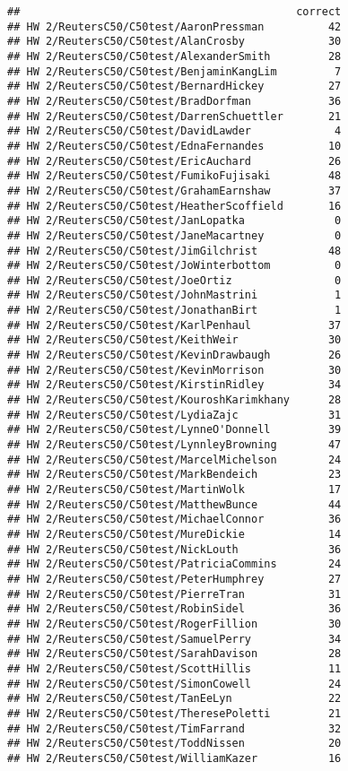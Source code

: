 \documentclass[]{article}
\begin{document}
\begin{verbatim}
##                                           correct
## HW 2/ReutersC50/C50test/AaronPressman          42
## HW 2/ReutersC50/C50test/AlanCrosby             30
## HW 2/ReutersC50/C50test/AlexanderSmith         28
## HW 2/ReutersC50/C50test/BenjaminKangLim         7
## HW 2/ReutersC50/C50test/BernardHickey          27
## HW 2/ReutersC50/C50test/BradDorfman            36
## HW 2/ReutersC50/C50test/DarrenSchuettler       21
## HW 2/ReutersC50/C50test/DavidLawder             4
## HW 2/ReutersC50/C50test/EdnaFernandes          10
## HW 2/ReutersC50/C50test/EricAuchard            26
## HW 2/ReutersC50/C50test/FumikoFujisaki         48
## HW 2/ReutersC50/C50test/GrahamEarnshaw         37
## HW 2/ReutersC50/C50test/HeatherScoffield       16
## HW 2/ReutersC50/C50test/JanLopatka              0
## HW 2/ReutersC50/C50test/JaneMacartney           0
## HW 2/ReutersC50/C50test/JimGilchrist           48
## HW 2/ReutersC50/C50test/JoWinterbottom          0
## HW 2/ReutersC50/C50test/JoeOrtiz                0
## HW 2/ReutersC50/C50test/JohnMastrini            1
## HW 2/ReutersC50/C50test/JonathanBirt            1
## HW 2/ReutersC50/C50test/KarlPenhaul            37
## HW 2/ReutersC50/C50test/KeithWeir              30
## HW 2/ReutersC50/C50test/KevinDrawbaugh         26
## HW 2/ReutersC50/C50test/KevinMorrison          30
## HW 2/ReutersC50/C50test/KirstinRidley          34
## HW 2/ReutersC50/C50test/KouroshKarimkhany      28
## HW 2/ReutersC50/C50test/LydiaZajc              31
## HW 2/ReutersC50/C50test/LynneO'Donnell         39
## HW 2/ReutersC50/C50test/LynnleyBrowning        47
## HW 2/ReutersC50/C50test/MarcelMichelson        24
## HW 2/ReutersC50/C50test/MarkBendeich           23
## HW 2/ReutersC50/C50test/MartinWolk             17
## HW 2/ReutersC50/C50test/MatthewBunce           44
## HW 2/ReutersC50/C50test/MichaelConnor          36
## HW 2/ReutersC50/C50test/MureDickie             14
## HW 2/ReutersC50/C50test/NickLouth              36
## HW 2/ReutersC50/C50test/PatriciaCommins        24
## HW 2/ReutersC50/C50test/PeterHumphrey          27
## HW 2/ReutersC50/C50test/PierreTran             31
## HW 2/ReutersC50/C50test/RobinSidel             36
## HW 2/ReutersC50/C50test/RogerFillion           30
## HW 2/ReutersC50/C50test/SamuelPerry            34
## HW 2/ReutersC50/C50test/SarahDavison           28
## HW 2/ReutersC50/C50test/ScottHillis            11
## HW 2/ReutersC50/C50test/SimonCowell            24
## HW 2/ReutersC50/C50test/TanEeLyn               22
## HW 2/ReutersC50/C50test/TheresePoletti         21
## HW 2/ReutersC50/C50test/TimFarrand             32
## HW 2/ReutersC50/C50test/ToddNissen             20
## HW 2/ReutersC50/C50test/WilliamKazer           16
\end{verbatim}
\end{document}
